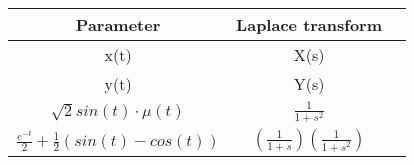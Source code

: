 \begin{tabular}{|c|c|c}
    \hline
    Parameter & Laplace transform \\
    \hline
    x(t) & X(s) \\
    \hline
    y(t) & Y(s) \\
    \hline
    $\sqrt{2}sin(t)\cdot\mu(t)$ & $\frac{1}{1+s^2}$ \\
    \hline
    $\frac{e^{-t}}{2}+\frac{1}{2}(sin(t)-cos(t))$ & $(\frac{1}{1+s})(\frac{1}{1+s^2})$\\ 
    \hline
\end{tabular}
